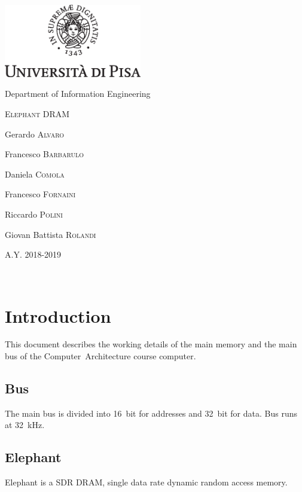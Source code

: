 \documentclass[a4paper,12pt]{article}
\newcommand{\memoryname}{Elephant}
\begin{document}
{
  \begin{titlepage}
  	\centering
  	\includegraphics[width=6cm]{img/unipi.eps}\par
    \vspace{1.5cm}
    {\Large Department of Information Engineering \par}
  	\vspace{1.5cm}
  	{\huge\textsc{\memoryname{} DRAM}\par}
  	\vspace{2cm}
  	Gerardo \textsc{Alvaro}\par
  	Francesco \textsc{Barbarulo}\par
    Daniela \textsc{Comola}\par
    Francesco \textsc{Fornaini}\par
    Riccardo \textsc{Polini}\par
    Giovan Battista \textsc{Rolandi}

  	\vfill

  	{\large A.Y. 2018-2019\par}
  \end{titlepage}
}

\clearpage
~
\clearpage

\tableofcontents

\clearpage

\section{Introduction}

This document describes the working details of the main memory and the main bus of the Computer~Architecture course computer.

\subsection{Bus}
The main bus is divided into 16~bit for addresses and 32~bit for data.
Bus runs at 32~kHz.

\subsection{\memoryname{}}
\memoryname{} is a SDR DRAM, single data rate dynamic random access memory.
\end{document}
